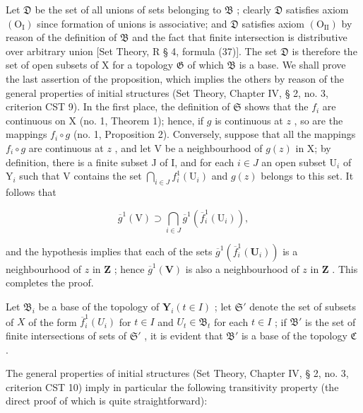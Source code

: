 Let \(\mathfrak{D}\) be the set of all unions of sets belonging to \(\mathfrak{B}\) ; clearly \(\mathfrak{D}\) satisfies axiom \((\mathrm{O}_{\mathrm{I}})\) since formation of unions is associative; and \(\mathfrak{D}\) satisfies axiom \((\mathrm{O}_{\mathrm{II}})\) by reason of the definition of \(\mathfrak{B}\) and the fact that finite intersection is distributive over arbitrary union {[}Set Theory, R § 4, formula (37){]}. The set \(\mathfrak{D}\) is therefore the set of open subsets of X for a topology \(\mathfrak{G}\) of which \(\mathfrak{B}\) is a base. We shall prove the last assertion of the proposition, which implies the others by reason of the general properties of initial structures (Set Theory, Chapter IV, § 2, no. 3, criterion CST 9). In the first place, the definition of \(\mathfrak{S}\) shows that the \(f_{i}\) are continuous on X (no. 1, Theorem 1); hence, if \(g\) is continuous at \(z\) , so are the mappings \(f_{i} \circ g\) (no. 1, Proposition 2). Conversely, suppose that all the mappings \(f_{i} \circ g\) are continuous at \(z\) , and let V be a neighbourhood of \(g(z)\) in X; by definition, there is a finite subset J of I, and for each \(i \in J\) an open subset \(\mathrm{U}_{i}\) of \(\mathrm{Y}_{i}\) such that V contains the set \(\bigcap_{i \in J} f_{i}^{1}(\mathrm{U}_{i})\) and \(g(z)\) belongs to this set. It follows that

\[
\overline {{g}} ^ {1} (\mathrm{V}) \supset \bigcap_ {i \in J} \overline {{g}} ^ {1} (\overline {{f}} _ {i} ^ {1} (\mathrm{U} _ {i})),
\]

and the hypothesis implies that each of the sets \(\overline{g}^{1}(\overline{f}_{i}^{1}(\mathbf{U}_{i}))\) is a neighbourhood of \(z\) in \(\mathbf{Z}\) ; hence \(\overline{g}^{1}(\mathbf{V})\) is also a neighbourhood of \(z\) in \(\mathbf{Z}\) . This completes the proof.

Let \(\mathfrak{B}_i\) be a base of the topology of \(\mathbf{Y}_i(t\in I)\) ; let \(\mathfrak{S}'\) denote the set of subsets of \(X\) of the form \(\overline{f}_i^1 (U_i)\) for \(t\in I\) and \(U_{t}\in \mathfrak{B}_{t}\) for each \(t\in I\) ; if \(\mathfrak{B}'\) is the set of finite intersections of sets of \(\mathfrak{S}'\) , it is evident that \(\mathfrak{B}'\) is a base of the topology \(\mathfrak{C}\) .

The general properties of initial structures (Set Theory, Chapter IV, § 2, no. 3, criterion CST 10) imply in particular the following transitivity property (the direct proof of which is quite straightforward):

